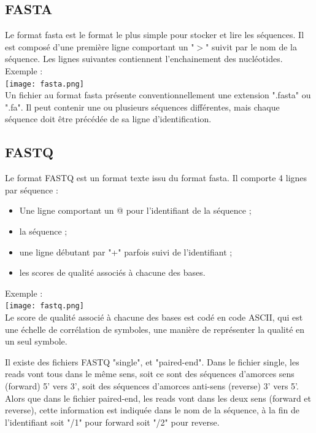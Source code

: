 \documentclass[a4paper,12pt]{article}
\begin{document}
\subsection{FASTA}
Le format fasta est le format le plus simple pour stocker et lire les séquences. Il est composé d'une première ligne comportant un "$>$" suivit par le nom de la séquence. Les lignes suivantes contiennent l'enchainement des nucléotides. \\

Exemple : \\

\texttt{[image: fasta.png]}~\\

Un fichier au format fasta présente conventionnellement une extension ".fasta" ou ".fa". Il peut contenir une ou plusieurs séquences différentes, mais chaque séquence doit être précédée de sa ligne d'identification. 

\subsection{FASTQ}

Le format FASTQ est un format texte issu du format fasta. Il comporte 4 lignes par séquence :
\begin{itemize}
\item Une ligne comportant un @ pour l'identifiant de la séquence ;
\item la séquence ;
\item une ligne débutant par "+" parfois suivi de l’identifiant ;
\item les scores de qualité associés à chacune des bases.
\end{itemize}

Exemple : \\

\texttt{[image: fastq.png]}~\\

Le score de qualité associé à chacune des bases est codé en code ASCII, qui est une échelle de corrélation de symboles, une manière de représenter la qualité en un seul symbole.

Il existe des fichiers FASTQ "single", et "paired-end". Dans le fichier single, les reads vont tous dans le même sens, soit ce sont des séquences d'amorces sens (forward) 5' vers 3', soit des séquences d'amorces anti-sens (reverse) 3' vers 5'. Alors que dans le fichier paired-end, les reads vont dans les deux sens (forward et reverse), cette information est indiquée dans le nom de la séquence, à la fin de l'identifiant soit "/1" pour forward soit "/2" pour reverse.
\end{document}
